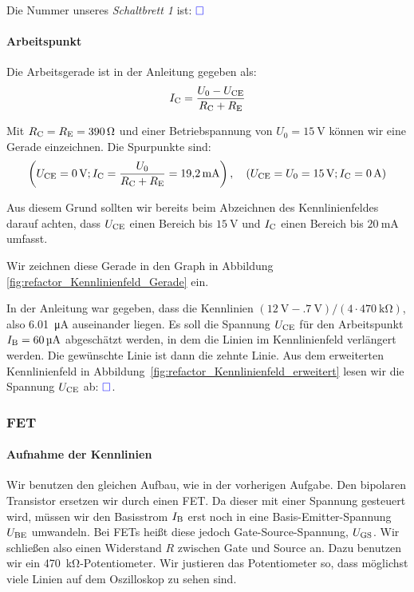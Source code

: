 Die Nummer unseres \emph{Schaltbrett 1} ist: $\textcolor{blue}{\square}$

\paragraph{Arbeitspunkt}

Die Arbeitsgerade ist in der Anleitung gegeben als:
\cite[Formel~3/4.6]{physik313-Anleitung}
\begin{equation}
	\label{eq:3_4-6}
	I_\text{C} = \frac{U_0 - U_\text{CE}}{R_\text{C} + R_\text{E}}
\end{equation}

Mit $R_\text{C} = R_\text{E} = \SI{390}\ohm$ und einer Betriebspannung von $U_0 =
\SI{15}\volt$ können wir eine Gerade einzeichnen. Die Spurpunkte sind:
\[
	\del{\UCE = \SI0\volt; \IC = \frac{U_0}{\RC + \RE} = \SI{19.2}{\milli\ampere}}
	\eqnsep
	\del{\UCE = U_0 = \SI{15}\volt; \IC = \SI0\ampere}
\]

Aus diesem Grund sollten wir bereits beim Abzeichnen des Kennlinienfeldes
darauf achten, dass $U_\text{CE}$ einen Bereich bis $\SI{15}\volt$ und $I_\text{C}$ einen
Bereich bis $\SI{20}{\milli\ampere}$ umfasst.

Wir zeichnen diese Gerade in den Graph in Abbildung
\ref{fig:refactor_Kennlinienfeld_Gerade} ein.

In der Anleitung war gegeben, dass die Kennlinien $(\SI{12}\volt -
\SI{.7}\volt)/(4 \cdot \SI{470}{\kilo\ohm})$, also \SI{6.01}{\micro\ampere}
auseinander liegen. Es soll die Spannung $U_\text{CE}$ für den Arbeitspunkt $I_\text{B} =
\SI{60}{\micro\ampere}$ abgeschätzt werden, in dem die Linien im Kennlinienfeld
verlängert werden. Die gewünschte Linie ist dann die zehnte Linie. Aus dem
erweiterten Kennlinienfeld in
Abbildung~\ref{fig:refactor_Kennlinienfeld_erweitert} lesen wir die Spannung
$U_\text{CE}$ ab: $\textcolor{blue}{\square}$.

\subsubsection{FET}

\paragraph{Aufnahme der Kennlinien}

Wir benutzen den gleichen Aufbau, wie in der vorherigen Aufgabe. Den bipolaren
Transistor ersetzen wir durch einen FET. Da dieser mit einer Spannung gesteuert
wird, müssen wir den Basisstrom $I_\text{B}$ erst noch in eine Basis-Emitter-Spannung
$U_\text{BE}$ umwandeln. Bei FETs heißt diese jedoch Gate-Source-Spannung, $U_\text{GS}$. Wir
schließen also einen Widerstand $R$ zwischen Gate und Source an. Dazu benutzen
wir ein \SI{470}{\kilo\ohm}-Potentiometer. Wir justieren das Potentiometer so,
dass möglichst viele Linien auf dem Oszilloskop zu sehen sind.

